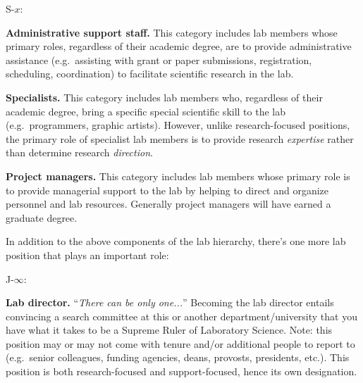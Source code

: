 \documentclass{tufte-book} %
\begin{document}
\begin{list}{S-$x$:~}{}
\item \textbf{Administrative support staff.}  This category includes
  lab members whose primary roles, regardless of their academic
  degree, are to provide administrative assistance (e.g.\ assisting with
  grant or paper submissions, registration, scheduling, coordination)
  to facilitate scientific research in the lab.
\item \textbf{Specialists.}  This category includes lab
  members who, regardless of their academic degree, bring
  a specific special scientific skill to the lab (e.g.\ programmers, graphic
  artists).  However, unlike research-focused positions, the primary
  role of specialist lab members is to provide research \textit{expertise}
  rather than determine research \textit{direction}.
\item \textbf{Project managers.}  This category includes lab members
  whose primary role is to provide managerial support to the lab by
  helping to direct and organize personnel and lab resources.
  Generally project managers will have earned a graduate degree.
\end{list}
In addition to the above components of the lab hierarchy, there's one more
lab position that plays an important role:
\begin{list}{J-$\infty$:~}{}
\item \textbf{Lab director.}  ``\textit{There can be only one...}''
  Becoming the lab director entails convincing a search committee
  at this or another department/university that you have what it takes to be a
  Supreme Ruler of Laboratory Science. Note: this position may or may not come with
  tenure and/or additional people to report to (e.g.\ senior
  colleagues, funding
  agencies, deans, provosts, presidents, etc.).  This position is both
  research-focused and support-focused, hence its own designation.
\end{list}

\newpage
\end{document}
